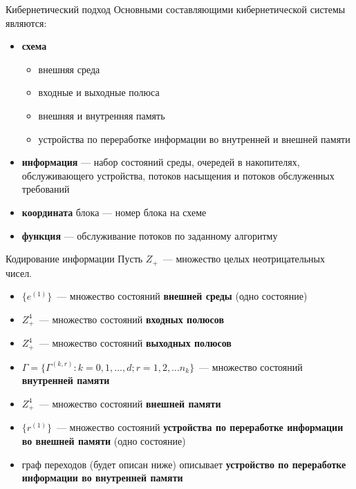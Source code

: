\documentclass[10pt]{beamer}
\begin{document}
\begin{frame}[allowframebreaks]{Кибернетический подход}
Основными составляющими кибернетической системы являются:
  \begin{itemize}
  \item \textbf{схема}
  \begin{itemize}
      \item внешняя среда
      \item входные и выходные полюса
      \item внешняя и внутренняя память
      \item устройства по переработке информации во внутренней и внешней памяти
      \end{itemize}
  \item \textbf{информация} --- набор состояний среды, очередей в накопителях, обслуживающего устройства, потоков насыщения и потоков обслуженных требований
  \item \textbf{координата} блока --- номер блока на схеме
  \item \textbf{функция} --- обслуживание потоков по заданному алгоритму
  \end{itemize}

\end{frame}

\begin{frame}{Кодирование информации}
Пусть $Z_+$~--- множество целых неотрицательных чисел.
  \begin{itemize}
  \item $\{e^{(1)}\}$~--- множество состояний \textbf{внешней среды} (одно состояние)
  \item $Z_+^4$~--- множество состояний \textbf{входных полюсов}
  \item $Z_+^4$~--- множество состояний \textbf{выходных полюсов}
  \item $\Gamma=\{\Gamma^{(k,r)} \colon k=0,1,\ldots,d; r=1,2,\ldots n_k\}$~--- множество состояний \textbf{внутренней памяти}
  \item $Z_+^4$~--- множество состояний \textbf{внешней памяти}
  \item $\{r^{(1)}\}$~--- множество состояний \textbf{устройства по переработке информации во внешней памяти} (одно состояние)
  \item граф переходов (будет описан ниже) описывает \textbf{устройство по переработке информации во внутренней памяти}
  \end{itemize}
\end{frame}
\end{document}
